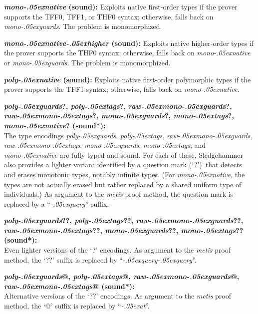 \documentclass[a4paper,12pt]{article}
\renewcommand\_{\hbox{\textunderscore\kern-.05ex}}
\begin{document}
\begin{enum}
\begin{enum}
\item[\labelitemi] \textbf{\textit{mono\_native} (sound):} Exploits native
first-order types if the prover supports the TFF0, TFF1, or THF0 syntax;
otherwise, falls back on \textit{mono\_guards}. The problem is monomorphized.

\item[\labelitemi] \textbf{\textit{mono\_native\_higher} (sound):} Exploits
native higher-order types if the prover supports the THF0 syntax; otherwise,
falls back on \textit{mono\_native} or \textit{mono\_guards}. The problem is
monomorphized.

\item[\labelitemi] \textbf{\textit{poly\_native} (sound):} Exploits native
first-order polymorphic types if the prover supports the TFF1 syntax; otherwise,
falls back on \textit{mono\_native}.

\item[\labelitemi]
\textbf{%
\textit{poly\_guards}?, \textit{poly\_tags}?, \textit{raw\_mono\_guards}?, \\
\textit{raw\_mono\_tags}?, \textit{mono\_guards}?, \textit{mono\_tags}?, \\
\textit{mono\_native}? (sound*):} \\
The type encodings \textit{poly\_guards}, \textit{poly\_tags},
\textit{raw\_mono\_guards}, \textit{raw\_mono\_tags}, \textit{mono\_guards},
\textit{mono\_tags}, and \textit{mono\_native} are fully typed and sound. For
each of these, Sledgehammer also provides a lighter variant identified by a
question mark (`\hbox{?}')\ that detects and erases monotonic types, notably
infinite types. (For \textit{mono\_native}, the types are not actually erased
but rather replaced by a shared uniform type of individuals.) As argument to the
\textit{metis} proof method, the question mark is replaced by a
\hbox{``\textit{\_query\/}''} suffix.

\item[\labelitemi]
\textbf{%
\textit{poly\_guards}??, \textit{poly\_tags}??, \textit{raw\_mono\_guards}??, \\
\textit{raw\_mono\_tags}??, \textit{mono\_guards}??, \textit{mono\_tags}?? \\
(sound*):} \\
Even lighter versions of the `\hbox{?}' encodings. As argument to the
\textit{metis} proof method, the `\hbox{??}' suffix is replaced by
\hbox{``\textit{\_query\_query\/}''}.

\item[\labelitemi]
\textbf{%
\textit{poly\_guards}@, \textit{poly\_tags}@, \textit{raw\_mono\_guards}@, \\
\textit{raw\_mono\_tags}@ (sound*):} \\
Alternative versions of the `\hbox{??}' encodings. As argument to the
\textit{metis} proof method, the `\hbox{@}' suffix is replaced by
\hbox{``\textit{\_at\/}''}.


\end{enum}
\end{enum}
\end{document}
